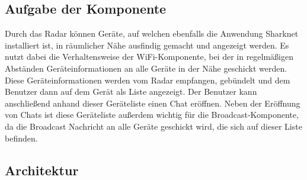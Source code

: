 \subsection{Aufgabe der Komponente}
Durch das Radar können Geräte, auf welchen ebenfalls die Anwendung Sharknet installiert ist, in räumlicher Nähe ausfindig gemacht und angezeigt werden. Es nutzt dabei die Verhaltensweise der WiFi-Komponente, bei der in regelmäßigen Abständen Geräteinformationen an alle Geräte in der Nähe geschickt werden. Diese Geräteinformationen werden vom Radar empfangen, gebündelt und dem Benutzer dann auf dem Gerät als Liste angezeigt. Der Benutzer kann anschließend anhand dieser Geräteliste einen Chat eröffnen. Neben der Eröffnung von Chats ist diese Geräteliste außerdem wichtig für die Broadcast-Komponente, da die Broadcast Nachricht an alle Geräte geschickt wird, die sich auf dieser Liste befinden.

\subsection{Architektur}

